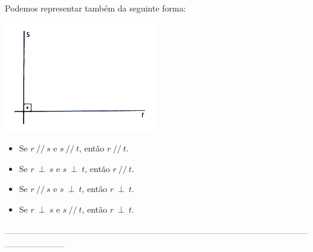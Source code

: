 \documentclass[a4paper,14pt]{article}
\begin{document}
		Podemos representar também da seguinte forma:
		\begin{center}
			\includegraphics[width=0.5\linewidth]{6FMA69_imagens/imagem3}
		\end{center}
		\begin{itemize}
			\item Se $r~//~s$ e $s~//~t$, então $r~//~t$.
			\item Se $r~\perp~s$ e $s~\perp~t$, então $r~//~t$.
			\item Se $r~//~s$ e $s~\perp~t$, então $r~\perp~t$.
			\item Se $r~\perp~s$ e $s~//~t$, então $r~\perp~t$.
		\end{itemize}
		\noindent\textsubscript{-----------------------------------------------------------------------------------------------------------------------------------------------------------}
\end{document}
